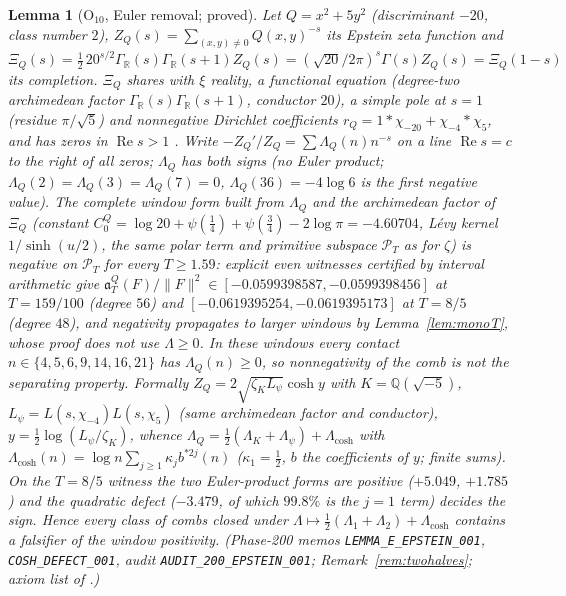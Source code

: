 \documentclass[11pt]{amsart}
\newtheorem{lemma}[theorem]{Lemma}
\theoremstyle{definition}
\theoremstyle{remark}
\newcommand{\R}{\mathbb R}
\newcommand{\Q}{\mathbb Q}
\newcommand{\Rel}{\operatorname{Re}}
\newcommand{\PT}{\mathcal P_T}
\begin{document}
\begin{lemma}[$\mathrm O_{10}$, Euler removal; proved]\label{lem:shape-epstein}
Let $Q=x^2+5y^2$ (discriminant $-20$, class number $2$), $Z_Q(s)=\sum_{(x,y)\ne0}Q(x,y)^{-s}$ its Epstein zeta function and
$\Xi_Q(s)=\tfrac12\,20^{s/2}\Gamma_\R(s)\Gamma_\R(s+1)Z_Q(s)=(\sqrt{20}/2\pi)^s\Gamma(s)Z_Q(s)=\Xi_Q(1-s)$ its completion.
$\Xi_Q$ shares with $\xi$ reality, a functional equation (degree-two archimedean factor $\Gamma_\R(s)\Gamma_\R(s+1)$, conductor
$20$), a simple pole at $s=1$ (residue $\pi/\sqrt5$) and nonnegative Dirichlet coefficients $r_Q=1*\chi_{-20}+\chi_{-4}*\chi_5$,
and has zeros in $\Rel s>1$ \cite{DavenportHeilbronn1936}. Write $-Z_Q'/Z_Q=\sum\Lambda_Q(n)n^{-s}$ on a line $\Rel s=c$ to the
right of all zeros; $\Lambda_Q$ has both signs (no Euler product; $\Lambda_Q(2)=\Lambda_Q(3)=\Lambda_Q(7)=0$,
$\Lambda_Q(36)=-4\log6$ is the first negative value). The complete window form built from $\Lambda_Q$ and the archimedean factor
of $\Xi_Q$ (constant $C_0^Q=\log20+\psi(\tfrac14)+\psi(\tfrac34)-2\log\pi=-4.60704$, L\'evy kernel $1/\sinh(u/2)$, the same polar
term and primitive subspace $\PT$ as for $\zeta$) is negative on $\PT$ for every $T\ge1.59$: explicit even witnesses certified by
interval arithmetic give $\mathfrak a_T^Q(F)/\|F\|^2\in[-0.0599398587,-0.0599398456]$ at $T=159/100$ (degree $56$) and
$[-0.0619395254,-0.0619395173]$ at $T=8/5$ (degree $48$), and negativity propagates to larger windows by Lemma~\ref{lem:monoT},
whose proof does not use $\Lambda\ge0$. In these windows every contact $n\in\{4,5,6,9,14,16,21\}$ has $\Lambda_Q(n)\ge0$, so
nonnegativity of the comb is not the separating property. Formally $Z_Q=2\sqrt{\zeta_K L_\psi}\cosh y$ with $K=\Q(\sqrt{-5})$,
$L_\psi=L(s,\chi_{-4})L(s,\chi_5)$ (same archimedean factor and conductor), $y=\tfrac12\log(L_\psi/\zeta_K)$, whence
$\Lambda_Q=\tfrac12(\Lambda_K+\Lambda_\psi)+\Lambda_{\cosh}$ with $\Lambda_{\cosh}(n)=\log n\sum_{j\ge1}\kappa_j b^{*2j}(n)$
($\kappa_1=\tfrac12$, $b$ the coefficients of $y$; finite sums). On the $T=8/5$ witness the two Euler-product forms are positive
($+5.049$, $+1.785$) and the quadratic defect ($-3.479$, of which $99.8\%$ is the $j=1$ term) decides the sign. Hence every class of
combs closed under $\Lambda\mapsto\tfrac12(\Lambda_1+\Lambda_2)+\Lambda_{\cosh}$ contains a falsifier of the window positivity.
(Phase-200 memos \texttt{LEMMA\_E\_EPSTEIN\_001}, \texttt{COSH\_DEFECT\_001}, audit \texttt{AUDIT\_200\_EPSTEIN\_001};
Remark~\ref{rem:twohalves}; axiom list of \cite[Thms.~18.10, 18.16]{Paper46}.)
\end{lemma}
\end{document}
